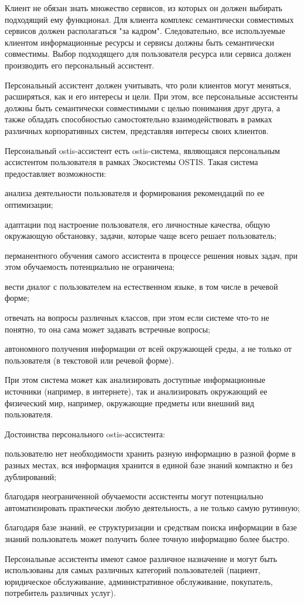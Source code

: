 Клиент не обязан знать множество сервисов, из которых он должен выбирать подходящий ему функционал. 
Для клиента комплекс семантически совместимых сервисов должен располагаться "за кадром"{}. 
Следовательно, все используемые клиентом информационные ресурсы и сервисы должны быть семантически совместимы. 
Выбор подходящего для пользователя ресурса или сервиса должен производить его персональный ассистент.

Персональный ассистент должен учитывать, что роли клиентов могут меняться, расширяться, как и его интересы и цели. 
При этом, все персональные ассистенты должны быть семантически совместимыми с целью понимания друг друга, а также обладать способностью самостоятельно взаимодействовать в рамках различных корпоративных систем, представляя интересы своих клиентов.

Персональный ostis-ассистент есть ostis-система, являющаяся персональным ассистентом пользователя в рамках Экосистемы OSTIS.
Такая система предоставляет возможности:
\begin{textitemize}
    \item анализа деятельности пользователя и формирования рекомендаций по ее оптимизации;
    \item адаптации под настроение пользователя, его личностные качества, общую окружающую обстановку, задачи, которые чаще всего решает пользователь;
    \item перманентного обучения самого ассистента в процессе решения новых задач, при этом обучаемость потенциально не ограничена;
    \item вести диалог с пользователем на естественном языке, в том числе в речевой форме;
    \item отвечать на вопросы различных классов, при этом если системе что-то не понятно, то она сама может задавать встречные вопросы;
    \item автономного получения информации от всей окружающей среды, а не только от пользователя (в текстовой или речевой форме).
\end{textitemize}

При этом система может как анализировать доступные информационные источники (например, в интернете), так и анализировать окружающий ее физический мир, например, окружающие предметы или внешний вид пользователя.

Достоинства персонального ostis-ассистента:
\begin{textitemize}
    \item пользователю нет необходимости хранить разную информацию в разной форме в разных местах, вся информация хранится в единой базе знаний компактно и без дублирований;
    \item благодаря неограниченной обучаемости ассистенты могут потенциально автоматизировать практически любую деятельность, а не только самую рутинную;
    \item благодаря базе знаний, ее структуризации и средствам поиска информации в базе знаний пользователь может получить более точную информацию более быстро.
\end{textitemize}

Персональные ассистенты имеют самое различное назначение и могут быть использованы для самых различных категорий пользователей (пациент, юридическое обслуживание, административное обслуживание, покупатель, потребитель различных услуг). 
